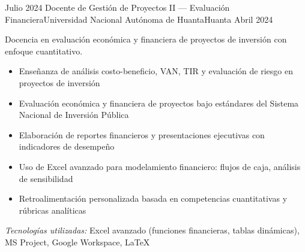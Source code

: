 \experience
{Julio 2024} {Docente de Gestión de Proyectos II — Evaluación Financiera}{Universidad Nacional Autónoma de Huanta}{Huanta}
{Abril 2024} {
	Docencia en evaluación económica y financiera de proyectos de inversión con enfoque cuantitativo.
	\begin{itemize}
		\item Enseñanza de análisis costo-beneficio, VAN, TIR y evaluación de riesgo en proyectos de inversión
		\item Evaluación económica y financiera de proyectos bajo estándares del Sistema Nacional de Inversión Pública
		\item Elaboración de reportes financieros y presentaciones ejecutivas con indicadores de desempeño
		\item Uso de Excel avanzado para modelamiento financiero: flujos de caja, análisis de sensibilidad
		\item Retroalimentación personalizada basada en competencias cuantitativas y rúbricas analíticas
	\end{itemize}
}
{\footnotesize{\emph{Tecnologías utilizadas:} Excel avanzado (funciones financieras, tablas dinámicas), MS Project, Google Workspace, LaTeX}}
